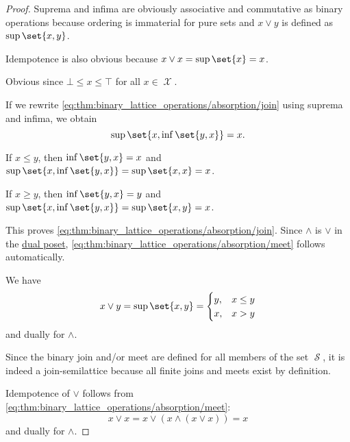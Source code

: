 \begin{proof}
   Suprema and infima are obviously associative and commutative as binary operations because ordering is immaterial for pure sets and \( x \vee y \) is defined as \( \sup\set{ x, y } \).

  Idempotence is also obvious because \( x \vee x = \sup\set{ x } = x \).

   Obvious since \( \bot \leq x \leq \top \) for all \( x \in \mscrX \).

   If we rewrite \eqref{eq:thm:binary_lattice_operations/absorption/join} using suprema and infima, we obtain
  \begin{equation*}
    \sup\set{ x, \inf\set{ y, x } } = x.
  \end{equation*}

  If \( x \leq y \), then \( \inf\set{ y, x } = x \) and \( \sup\set{ x, \inf\set{ y, x } } = \sup\set{ x, x } = x \).

  If \( x \geq y \), then \( \inf\set{ y, x } = y \) and \( \sup\set{ x, \inf\set{ y, x } } = \sup\set{ x, y } = x \).

  This proves \eqref{eq:thm:binary_lattice_operations/absorption/join}. Since \( \wedge \) is \( \vee \) in the \hyperref[def:preordered_set/duality]{dual poset}, \eqref{eq:thm:binary_lattice_operations/absorption/meet} follows automatically.

   We have
  \begin{equation*}
    x \vee y
    =
    \sup\set{ x, y }
    =
    \begin{cases}
      y, &x \leq y \\
      x, &x > y
    \end{cases}
  \end{equation*}
  and dually for \( \wedge \).

   Since the binary join and/or meet are defined for all members of the set \( \mscrS \), it is indeed a join-semilattice because all finite joins and meets exist by definition.

  Idempotence of \( \vee \) follows from \eqref{eq:thm:binary_lattice_operations/absorption/meet}:
  \begin{equation*}
    x \vee x = x \vee (x \wedge (x \vee x)) = x
  \end{equation*}
  and dually for \( \wedge \).
\end{proof}

